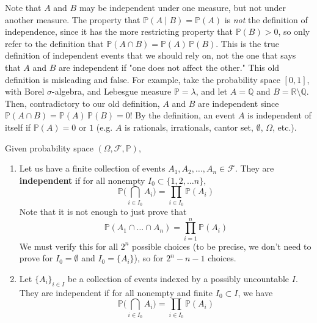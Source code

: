 \documentclass{article}
\begin{document}
    Note that $A$ and $B$ may be independent under one measure, but not under another measure. The property that $\mathbb{P}(A \mid B) = \mathbb{P}(A)$ is \textit{not} the definition of independence, since it has the more restricting property that $\mathbb{P}(B) > 0$, so only refer to the definition that $\mathbb{P}(A \cap B) = \mathbb{P}(A) \, \mathbb{P}(B)$. This is the true definition of independent events that we should rely on, not the one that says that $A$ and $B$ are independent if "one does not affect the other." This old definition is misleading and false. For example, take the probability space $[0, 1]$, with Borel $\sigma$-algebra, and Lebesgue measure $\mathbb{P} = \lambda$, and let $A = \mathbb{Q}$ and $B = \mathbb{R} \setminus \mathbb{Q}$. Then, contradictory to our old definition, $A$ and $B$ are independent since $\mathbb{P}(A \cap B) = \mathbb{P}(A) \, \mathbb{P}(B) = 0$! By the definition, an event $A$ is independent of itself if $\mathbb{P}(A) = 0$ or $1$ (e.g. $A$ is rationals, irrationals, cantor set, $\emptyset$, $\Omega$, etc.). 

    \begin{definition}
      Given probability space $(\Omega, \mathcal{F}, \mathbb{P})$, 
      \begin{enumerate}
        \item Let us have a finite collection of events $A_1, A_2, \ldots, A_n \in \mathcal{F}$. They are \textbf{independent} if for all nonempty $I_0 \subset \{1, 2, \ldots n\}$, 
        \begin{equation}
          \mathbb{P} \bigg( \bigcap_{i \in I_0} A_i \bigg) = \prod_{i \in I_0} \mathbb{P}(A_i)
        \end{equation}
        Note that it is not enough to just prove that 
        \begin{equation}
          \mathbb{P}(A_1 \cap \ldots \cap A_n) = \prod_{i=1}^n \mathbb{P}(A_i)
        \end{equation}
        We must verify this for all $2^n$ possible choices (to be precise, we don't need to prove for $I_0 = \emptyset$ and $I_0 = \{A_i\}$), so for $2^n - n - 1$ choices. 
        
        \item Let $\{A_i\}_{i \in I}$ be a collection of events indexed by a possibly uncountable $I$. They are independent if for all nonempty and finite $I_0 \subset I$, we have 
        \begin{equation}
          \mathbb{P} \bigg( \bigcap_{i \in I_0} A_i \bigg) = \prod_{i \in I_0} \mathbb{P}(A_i)
        \end{equation}
      \end{enumerate}
    \end{definition}
\end{document}
